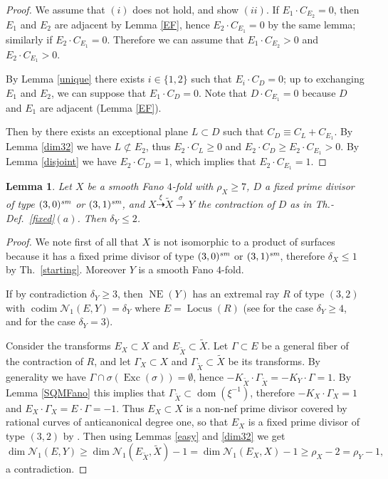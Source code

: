 \documentclass[a4paper,12pt]{amsart}
\newtheorem{lemma}[thm]{Lemma}
\theoremstyle{definition}
\numberwithin{figure}{section}
\numberwithin{table}{section}
\newcommand{\w}{\widetilde}
\newcommand{\N}{\mathcal{N}_1}
\newcommand{\dom}{\operatorname{dom}}
\newcommand{\NE}{\operatorname{NE}}
\newcommand{\Exc}{\operatorname{Exc}}
\newcommand{\Lo}{\operatorname{Locus}}
\newcommand{\codim}{\operatorname{codim}}
\newcommand{\sm}{\text{\it sm}}
\begin{document}
\begin{proof}
We assume that $(i)$ does not hold, and show $(ii)$.
If $E_1\cdot C_{E_2}=0$, then $E_1$ and $E_2$ are adjacent by Lemma \ref{EF}, hence
$E_2\cdot C_{E_1}=0$ by the same lemma; similarly if $E_2\cdot C_{E_1}=0$. Therefore we can assume that 
$E_1\cdot C_{E_2}>0$ and $E_2\cdot C_{E_1}>0$.

By Lemma \ref{unique} there exists $i\in\{1,2\}$ such that $E_{i}\cdot C_D=0$; up to exchanging $E_1$ and $E_2$, we can suppose that  $E_{1}\cdot C_D=0$. Note that $D\cdot C_{E_1}=0$ because $D$ and $E_1$ are adjacent (Lemma \ref{EF}).

Then by \cite[Lemma 6.9 and Prop.~6.1]{small} there exists an exceptional plane $L\subset D$ such that $C_D\equiv C_L+C_{E_1}$. By Lemma \ref{dim32} we have $L\not\subset E_2$, thus $E_2\cdot C_L\geq 0$ and 
 $E_2\cdot C_D\geq E_2\cdot C_{E_1}>0$. 
  By  Lemma \ref{disjoint}
  we have  $E_2\cdot C_D=1$, which implies that $E_2\cdot C_{E_1}=1$.
\end{proof}
\begin{lemma}\label{deltaY}
Let $X$ be a smooth Fano $4$-fold with $\rho_X\geq 7$, $D$ a fixed prime divisor of type $(3,0)^{\sm}$ or $(3,1)^{\sm}$, and $X\stackrel{\xi}{\dasharrow} \w{X}\stackrel{\sigma}{\to}Y$ the contraction of $D$ as in Th.-Def.~\ref{fixed}$(a)$. Then $\delta_Y\leq 2$.
\end{lemma}
\begin{proof}
  We note first of all that $X$ is not isomorphic to a product of surfaces because it has a  fixed prime divisor of type $(3,0)^{\sm}$ or $(3,1)^{\sm}$,
therefore
$\delta_X\leq 1$ by Th.~\ref{starting}. Moreover $Y$ is a smooth Fano $4$-fold.

 If by contradiction $\delta_Y\geq 3$, then $\NE(Y)$ has
 an extremal ray $R$ of type $(3,2)$ with $\codim\N(E,Y)=\delta_Y$ where $E=\Lo(R)$ (see \cite[Rem.~3.2.6]{codim} for the case $\delta_Y\geq 4$, and \cite[Th.~1.4 and proof of Lemmas 3.2 and 4.5]{delta3} for the case $\delta_Y=3$).

Consider the transforms $E_X\subset X$ and $E_{\w{X}}\subset\w{X}$.
Let $\Gamma\subset E$ be a general fiber of the contraction of $R$, and let
$\Gamma_X\subset X$ and $\Gamma_{\w{X}}\subset\w{X}$ be its transforms. By generality we have $\Gamma\cap \sigma(\Exc(\sigma))=\emptyset$, hence   $-K_{\w{X}}\cdot\Gamma_{\w{X}}=-K_Y\cdot\Gamma=1$. By Lemma \ref{SQMFano} this implies that $\Gamma_{\w{X}}\subset\dom(\xi^{-1})$, therefore $-K_X\cdot \Gamma_X=1$ and $E_X\cdot\Gamma_X=E\cdot\Gamma=-1$. Thus $E_X\subset X$ is a non-nef prime divisor covered by rational curves of anticanonical degree one, so that  $E_X$ is a fixed prime divisor of type $(3,2)$ by \cite[Lemma 2.18]{blowup}.
Then using Lemmas \ref{easy}  and \ref{dim32} we get
$$\dim\N(E,Y)\geq\dim\N(E_{\w{X}},\w{X})-1=\dim\N(E_X,X)-1\geq\rho_X-2=\rho_Y-1,$$ a contradiction.
\end{proof}   
\end{document}
